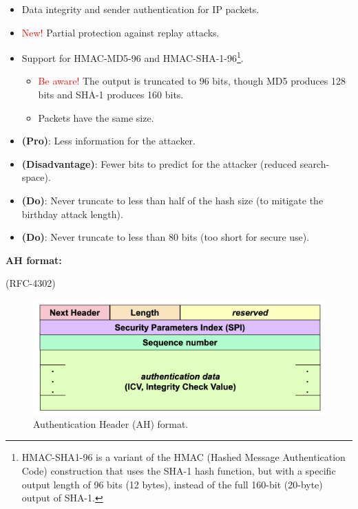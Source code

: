 \begin{itemize}
    \item Data integrity and sender authentication for IP packets.
    \item \textcolor{red}{New!} Partial protection against replay attacks.
    \item Support for HMAC-MD5-96 and HMAC-SHA-1-96\footnote{HMAC-SHA1-96 is a variant of the HMAC (Hashed Message Authentication Code) construction that uses the SHA-1 hash function, but with a specific output length of 96 bits (12 bytes), instead of the full 160-bit (20-byte) output of SHA-1.}.
    \begin{itemize}
        \item \textcolor{red}{Be aware! }The output is truncated to 96 bits, though MD5 produces 128 bits and SHA-1 produces 160 bits.
        \item Packets have the same size.
    \end{itemize} 
\end{itemize}

\begin{tcolorbox}[colback=blue!10!white, colframe=blue!50!white, title={For Any Truncated MAC}]
    \begin{itemize}
        \item \textbf{(Pro)}: Less information for the attacker.
        \item \textbf{(Disadvantage)}: Fewer bits to predict for the attacker (reduced search-space).
        \item \textbf{(Do)}: Never truncate to less than half of the hash size (to mitigate the birthday attack length).
        \item \textbf{(Do)}: Never truncate to less than 80 bits (too short for secure use).
    \end{itemize}
\end{tcolorbox}

\begin{center}
\textbf{AH format:}

    (RFC-4302)
\end{center}

\hfill

\begin{figure}[H]
    \includegraphics[width=\linewidth]{Images/NetSec/AH_format.png}
    \caption{Authentication Header (AH) format.}
\end{figure}

